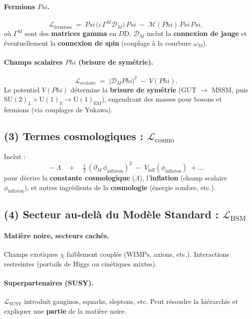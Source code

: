 \documentclass[12pt]{article}
\def\Phi{Phi}%
\def\Psi{Psi}%
\begin{document}
\paragraph{Fermions \(\Psi\).}
\[
\mathcal{L}_{\text{fermions}}
\;=\;
\overline{\Psi}\,\bigl(i\,\Gamma^M \mathcal{D}_M\bigr)\,\Psi
\;-\;
\mathcal{M}(\Phi)\,\overline{\Psi}\,\Psi,
\]
où \(\Gamma^M\) sont des \textbf{matrices gamma} en \(D\)D, 
\(\mathcal{D}_M\) inclut la \textbf{connexion de jauge} 
et éventuellement la \textbf{connexion de spin} 
(couplage à la courbure \(\omega_M\)).

\paragraph{Champs scalaires \(\Phi\) (brisure de symétrie).}
\[
\mathcal{L}_{\text{scalaire}}
\;=\;
|\mathcal{D}_M \Phi|^2
\;-\;
V(\Phi).
\]
Le potentiel \(V(\Phi)\) détermine la \textbf{brisure de symétrie} 
(GUT \(\to\) MSSM, puis \(\mathrm{SU}(2)_L\times\mathrm{U}(1)_Y\to\mathrm{U}(1)_{\mathrm{EM}}\)), 
engendrant des masses pour bosons et fermions (via couplages de Yukawa).

\subsection{(3) Termes cosmologiques : \(\mathcal{L}_{\text{cosmo}}\)}

Inclut :
\[
-\;\Lambda
\quad+\quad
\tfrac12\,(\partial_M\,\phi_{\text{inflaton}})^2
\;-\;
V_{\text{infl}}(\phi_{\text{inflaton}})
\;+\ldots
\]
pour décrire la \textbf{constante cosmologique} (\(\Lambda\)), 
l'\textbf{inflation} (champ scalaire $\phi_{\text{inflaton}}$), 
et autres ingrédients de la \textbf{cosmologie} (énergie sombre, etc.).

\subsection{(4) Secteur au-delà du Modèle Standard : \(\mathcal{L}_{\text{BSM}}\)}

\paragraph{Matière noire, secteurs cachés.}
Champs exotiques \(\chi\) faiblement couplés (\(\mathrm{WIMPs}\), axions, etc.).  
Interactions restreintes (portails de Higgs ou cinétiques mixtes).

\paragraph{Superpartenaires (SUSY).}
\(\mathcal{L}_{\text{SUSY}}\) introduit gauginos, squarks, sleptons, etc. 
Peut résoudre la hiérarchie et expliquer une \textbf{partie} de la matière noire.
\end{document}
